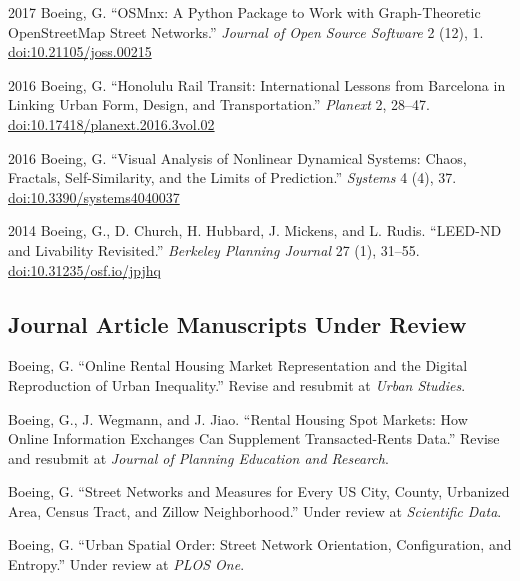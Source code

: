 \documentclass[12pt,letterpaper]{report}
\begin{document}
\begin{tablist}
		\item[2017] \tab Boeing, G. \enquote{OSMnx: A Python Package to Work with Graph-Theoretic OpenStreetMap Street Networks.} \textit{Journal of Open Source Software} 2 (12), 1. \href{https://doi.org/10.21105/joss.00215}{doi:10.21105/joss.00215}
		
		\item[2016] \tab Boeing, G. \enquote{Honolulu Rail Transit: International Lessons from Barcelona in Linking Urban Form, Design, and Transportation.} \textit{Planext} 2, 28--47. \href{https://doi.org/10.17418/planext.2016.3vol.02}{doi:10.17418/planext.2016.3vol.02}
		
		\item[2016] \tab Boeing, G. \enquote{Visual Analysis of Nonlinear Dynamical Systems: Chaos, Fractals, Self-Similarity, and the Limits of Prediction.} \textit{Systems} 4 (4), 37. \href{https://doi.org/10.3390/systems4040037}{doi:10.3390/systems4040037}
		
		\item[2014] \tab Boeing, G., D. Church, H. Hubbard, J. Mickens, and L. Rudis. \enquote{LEED-ND and Livability Revisited.} \textit{Berkeley Planning Journal} 27 (1), 31--55. \href{https://doi.org/10.31235/osf.io/jpjhq}{doi:10.31235/osf.io/jpjhq}
		
	\end{tablist}
	
	
	
	\subsection*{Journal Article Manuscripts Under Review}
	
	\begin{tablist}
		
		\item[\the\year] \tab Boeing, G. \enquote{Online Rental Housing Market Representation and the Digital Reproduction of Urban Inequality.} Revise and resubmit at \textit{Urban Studies}.
		
		\item[\the\year] \tab Boeing, G., J. Wegmann, and J. Jiao. \enquote{Rental Housing Spot Markets: How Online Information Exchanges Can Supplement Transacted-Rents Data.} Revise and resubmit at \textit{Journal of Planning Education and Research}.
		
		\item[\the\year] \tab Boeing, G. \enquote{Street Networks and Measures for Every US City, County, Urbanized Area, Census Tract, and Zillow Neighborhood.} Under review at \textit{Scientific Data}.
		
		\item[\the\year] \tab Boeing, G. \enquote{Urban Spatial Order: Street Network Orientation, Configuration, and Entropy.} Under review at \textit{PLOS One}.
		
	\end{tablist}
	
\end{document}
